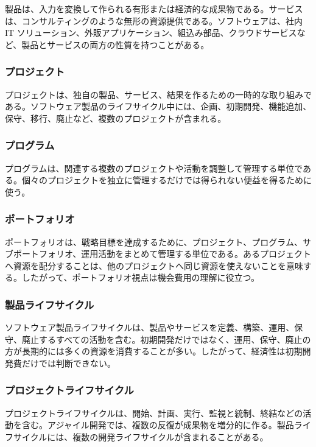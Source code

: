 \documentclass[a4paper,11pt]{ltjsarticle}
\numberwithin{figure}{section}
\numberwithin{table}{section}
\begin{document}
製品は、入力を変換して作られる有形または経済的な成果物である。サービスは、コンサルティングのような無形の資源提供である。ソフトウェアは、社内 IT ソリューション、外販アプリケーション、組込み部品、クラウドサービスなど、製品とサービスの両方の性質を持つことがある。

\subsubsection{プロジェクト}

プロジェクトは、独自の製品、サービス、結果を作るための一時的な取り組みである。ソフトウェア製品のライフサイクル中には、企画、初期開発、機能追加、保守、移行、廃止など、複数のプロジェクトが含まれる。

\subsubsection{プログラム}

プログラムは、関連する複数のプロジェクトや活動を調整して管理する単位である。個々のプロジェクトを独立に管理するだけでは得られない便益を得るために使う。

\subsubsection{ポートフォリオ}

ポートフォリオは、戦略目標を達成するために、プロジェクト、プログラム、サブポートフォリオ、運用活動をまとめて管理する単位である。あるプロジェクトへ資源を配分することは、他のプロジェクトへ同じ資源を使えないことを意味する。したがって、ポートフォリオ視点は機会費用の理解に役立つ。

\subsubsection{製品ライフサイクル}

ソフトウェア製品ライフサイクルは、製品やサービスを定義、構築、運用、保守、廃止するすべての活動を含む。初期開発だけではなく、運用、保守、廃止の方が長期的には多くの資源を消費することが多い。したがって、経済性は初期開発費だけでは判断できない。

\subsubsection{プロジェクトライフサイクル}

プロジェクトライフサイクルは、開始、計画、実行、監視と統制、終結などの活動を含む。アジャイル開発では、複数の反復が成果物を増分的に作る。製品ライフサイクルには、複数の開発ライフサイクルが含まれることがある。
\end{document}
